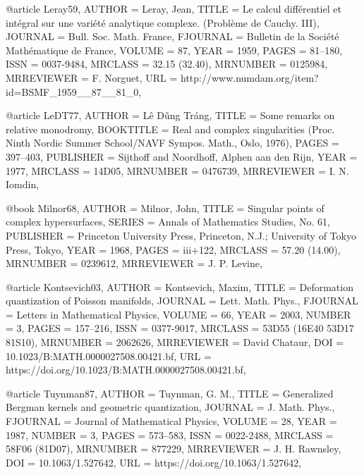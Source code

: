 @article {Leray59,
    AUTHOR = {Leray, Jean},
     TITLE = {Le calcul diff\'{e}rentiel et int\'{e}gral sur une vari\'{e}t\'{e} analytique
              complexe. ({P}robl\`eme de {C}auchy. {III})},
   JOURNAL = {Bull. Soc. Math. France},
  FJOURNAL = {Bulletin de la Soci\'{e}t\'{e} Math\'{e}matique de France},
    VOLUME = {87},
      YEAR = {1959},
     PAGES = {81--180},
      ISSN = {0037-9484},
   MRCLASS = {32.15 (32.40)},
  MRNUMBER = {0125984},
MRREVIEWER = {F. Norguet},
       URL = {http://www.numdam.org/item?id=BSMF_1959__87__81_0},
}

@article {LeDT77,
    AUTHOR = {L\^{e} D\~{u}ng Tr\'{a}ng},
     TITLE = {Some remarks on relative monodromy},
 BOOKTITLE = {Real and complex singularities ({P}roc. {N}inth {N}ordic
              {S}ummer {S}chool/{NAVF} {S}ympos. {M}ath., {O}slo, 1976)},
     PAGES = {397--403},
 PUBLISHER = {Sijthoff and Noordhoff, Alphen aan den Rijn},
      YEAR = {1977},
   MRCLASS = {14D05},
  MRNUMBER = {0476739},
MRREVIEWER = {I. N. Iomdin},
}

@book {Milnor68,
    AUTHOR = {Milnor, John},
     TITLE = {Singular points of complex hypersurfaces},
    SERIES = {Annals of Mathematics Studies, No. 61},
 PUBLISHER = {Princeton University Press, Princeton, N.J.; University of
              Tokyo Press, Tokyo},
      YEAR = {1968},
     PAGES = {iii+122},
   MRCLASS = {57.20 (14.00)},
  MRNUMBER = {0239612},
MRREVIEWER = {J. P. Levine},
}

@article {Kontsevich03,
    AUTHOR = {Kontsevich, Maxim},
     TITLE = {Deformation quantization of {P}oisson manifolds},
   JOURNAL = {Lett. Math. Phys.},
  FJOURNAL = {Letters in Mathematical Physics},
    VOLUME = {66},
      YEAR = {2003},
    NUMBER = {3},
     PAGES = {157--216},
      ISSN = {0377-9017},
   MRCLASS = {53D55 (16E40 53D17 81S10)},
  MRNUMBER = {2062626},
MRREVIEWER = {David Chataur},
       DOI = {10.1023/B:MATH.0000027508.00421.bf},
       URL = {https://doi.org/10.1023/B:MATH.0000027508.00421.bf},
}

@article {Tuynman87,
    AUTHOR = {Tuynman, G. M.},
     TITLE = {Generalized {B}ergman kernels and geometric quantization},
   JOURNAL = {J. Math. Phys.},
  FJOURNAL = {Journal of Mathematical Physics},
    VOLUME = {28},
      YEAR = {1987},
    NUMBER = {3},
     PAGES = {573--583},
      ISSN = {0022-2488},
   MRCLASS = {58F06 (81D07)},
  MRNUMBER = {877229},
MRREVIEWER = {J. H. Rawnsley},
       DOI = {10.1063/1.527642},
       URL = {https://doi.org/10.1063/1.527642},
}

